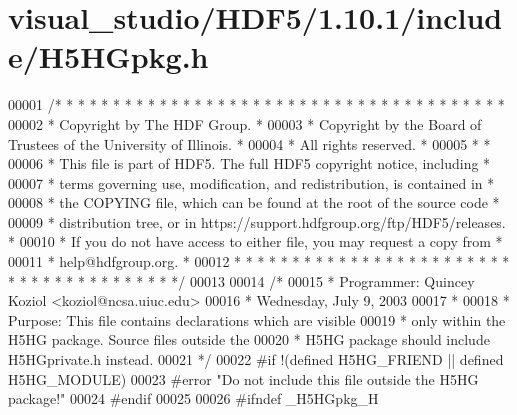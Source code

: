 \hypertarget{visual__studio_2_h_d_f5_21_810_81_2include_2_h5_h_gpkg_8h_source}{}\section{visual\+\_\+studio/\+H\+D\+F5/1.10.1/include/\+H5\+H\+Gpkg.h}
\label{visual__studio_2_h_d_f5_21_810_81_2include_2_h5_h_gpkg_8h_source}

\begin{DoxyCode}
00001 \textcolor{comment}{/* * * * * * * * * * * * * * * * * * * * * * * * * * * * * * * * * * * * * * *}
00002 \textcolor{comment}{ * Copyright by The HDF Group.                                               *}
00003 \textcolor{comment}{ * Copyright by the Board of Trustees of the University of Illinois.         *}
00004 \textcolor{comment}{ * All rights reserved.                                                      *}
00005 \textcolor{comment}{ *                                                                           *}
00006 \textcolor{comment}{ * This file is part of HDF5.  The full HDF5 copyright notice, including     *}
00007 \textcolor{comment}{ * terms governing use, modification, and redistribution, is contained in    *}
00008 \textcolor{comment}{ * the COPYING file, which can be found at the root of the source code       *}
00009 \textcolor{comment}{ * distribution tree, or in https://support.hdfgroup.org/ftp/HDF5/releases.  *}
00010 \textcolor{comment}{ * If you do not have access to either file, you may request a copy from     *}
00011 \textcolor{comment}{ * help@hdfgroup.org.                                                        *}
00012 \textcolor{comment}{ * * * * * * * * * * * * * * * * * * * * * * * * * * * * * * * * * * * * * * */}
00013 
00014 \textcolor{comment}{/*}
00015 \textcolor{comment}{ * Programmer: Quincey Koziol <koziol@ncsa.uiuc.edu>}
00016 \textcolor{comment}{ *             Wednesday, July 9, 2003}
00017 \textcolor{comment}{ *}
00018 \textcolor{comment}{ * Purpose:     This file contains declarations which are visible}
00019 \textcolor{comment}{ *              only within the H5HG package. Source files outside the}
00020 \textcolor{comment}{ *              H5HG package should include H5HGprivate.h instead.}
00021 \textcolor{comment}{ */}
00022 \textcolor{preprocessor}{#if !(defined H5HG\_FRIEND || defined H5HG\_MODULE)}
00023 \textcolor{preprocessor}{#error "Do not include this file outside the H5HG package!"}
00024 \textcolor{preprocessor}{#endif}
00025 
00026 \textcolor{preprocessor}{#ifndef \_H5HGpkg\_H}

\end{DoxyCode}
